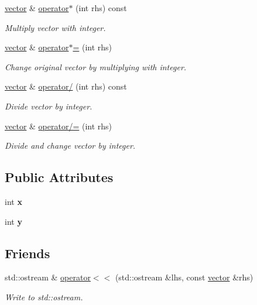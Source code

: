 \begin{DoxyCompactItemize}
\hyperlink{classvector}{vector} \& \hyperlink{classvector_a670fdc1cc083a1c6675bcb364915d338}{operator$\ast$} (int rhs) const 
\begin{DoxyCompactList}\small\item\em Multiply vector with integer. \end{DoxyCompactList}\item 
\hyperlink{classvector}{vector} \& \hyperlink{classvector_a810bc94e83cfd9eb092f7f39fcc77487}{operator$\ast$=} (int rhs)
\begin{DoxyCompactList}\small\item\em Change original vector by multiplying with integer. \end{DoxyCompactList}\item 
\hyperlink{classvector}{vector} \& \hyperlink{classvector_ab66f2a93a7fc9e8a1ab39eeb3a521597}{operator/} (int rhs) const 
\begin{DoxyCompactList}\small\item\em Divide vector by integer. \end{DoxyCompactList}\item 
\hyperlink{classvector}{vector} \& \hyperlink{classvector_a87765b60e94a08763ff2db6fe56125e9}{operator/=} (int rhs)
\begin{DoxyCompactList}\small\item\em Divide and change vector by integer. \end{DoxyCompactList}\end{DoxyCompactItemize}
\subsection*{Public Attributes}
\begin{DoxyCompactItemize}
\item 
int {\bfseries x}\hypertarget{classvector_a0403eb3aea23a3009e276fba1d317046}{}\label{classvector_a0403eb3aea23a3009e276fba1d317046}

\item 
int {\bfseries y}\hypertarget{classvector_aad6de640298eae97ca0a094db5aff477}{}\label{classvector_aad6de640298eae97ca0a094db5aff477}

\end{DoxyCompactItemize}
\subsection*{Friends}
\begin{DoxyCompactItemize}
\item 
std\+::ostream \& \hyperlink{classvector_a7a6813f75dabd6f9575f9d6f91890255}{operator$<$$<$} (std\+::ostream \&lhs, const \hyperlink{classvector}{vector} \&rhs)
\begin{DoxyCompactList}\small\item\em Write to std\+::ostream. \end{DoxyCompactList}\end{DoxyCompactItemize}


